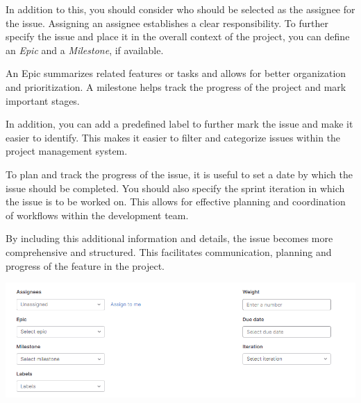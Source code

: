\documentclass[12pt]{article}
\begin{document}
In addition to this, you should consider who should be selected as the assignee for the issue. Assigning an assignee establishes a clear responsibility. To further specify the issue and place it in the overall context of the project, you can define an \textit{Epic} and a \textit{Milestone}, if available. 

An Epic summarizes related features or tasks and allows for better organization and prioritization. 
A milestone helps track the progress of the project and mark important stages.

In addition, you can add a predefined label to further mark the issue and make it easier to identify. This makes it easier to filter and categorize issues within the project management system.

To plan and track the progress of the issue, it is useful to set a date by which the issue should be completed. You should also specify the sprint iteration in which the issue is to be worked on. This allows for effective planning and coordination of workflows within the development team.

By including this additional information and details, the issue becomes more comprehensive and structured. This facilitates communication, planning and progress of the feature in the project.

 \includegraphics[width=\textwidth]{issue2.png}
    \label{fig:IssueTemplate2}
 
\end{document}
